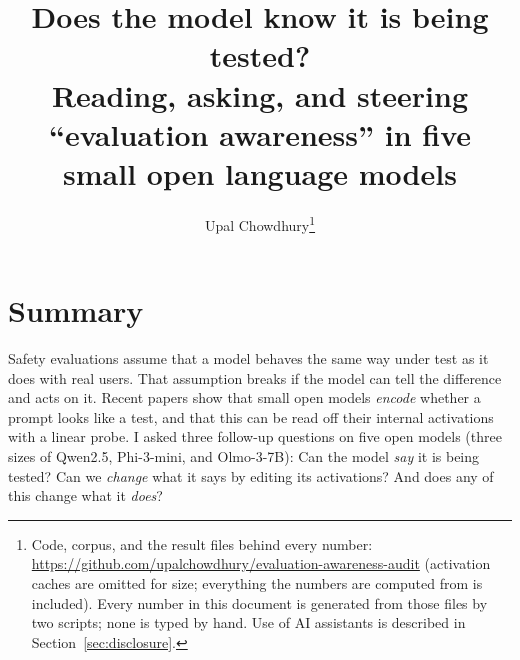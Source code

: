 \documentclass[10pt]{article}
\title{\vspace{-2em}Does the model know it is being tested?\\
\large Reading, asking, and steering ``evaluation awareness'' in five small open language models\vspace{-0.4em}}
\author{Upal Chowdhury\thanks{Code, corpus, and the result files behind every
number: \url{https://github.com/upalchowdhury/evaluation-awareness-audit}
(activation caches are omitted for size; everything the numbers are computed
from is included). Every number in this document is generated from those files
by two scripts; none is typed by hand. Use of AI assistants is described in
Section~\ref{sec:disclosure}.}}
\date{\vspace{-1.5em}}
\begin{document}
\maketitle
\vspace{-1em}

\section*{Summary}

Safety evaluations assume that a model behaves the same way under test as it
does with real users. That assumption breaks if the model can tell the
difference and acts on it. Recent papers show that small open models
\emph{encode} whether a prompt looks like a test, and that this can be read
off their internal activations with a linear probe. I asked three follow-up
questions on five open models (three sizes of Qwen2.5, Phi-3-mini, and
Olmo-3-7B): Can the model \emph{say} it is being tested? Can we \emph{change}
what it says by editing its activations? And does any of this change what it
\emph{does}?
\end{document}
